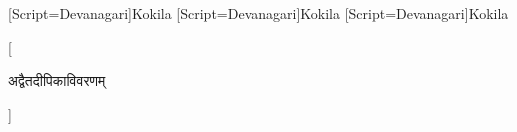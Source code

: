 









\newfontfamily{\footAfont}[Script=Devanagari]{Kokila}
\newfontfamily{\footBfont}[Script=Devanagari]{Kokila}
\newfontfamily{\footCfont}[Script=Devanagari]{Kokila}


\def\vivaranam#1{{\fontsize{12pt}{14pt}\selectfont\footAfont #1}}
\def\mUlaTippaNam#1{{\fontsize{10pt}{12pt}\selectfont\footBfont #1}}
\def\TIkATippaNam#1{{\fontsize{10pt}{12pt}\selectfont\footCfont #1}}


[\centerline{{\fontsize{7pt}{9pt}\selectfont अद्वैतदीपिकाविवरणम्}}\medskip] %
\SetFootnoteHook{\footAfont}
\renewcommand{\thefootnoteA}{} %

\SetFootnoteHook{\footBfont}


\SetFootnoteHook{\footCfont}

